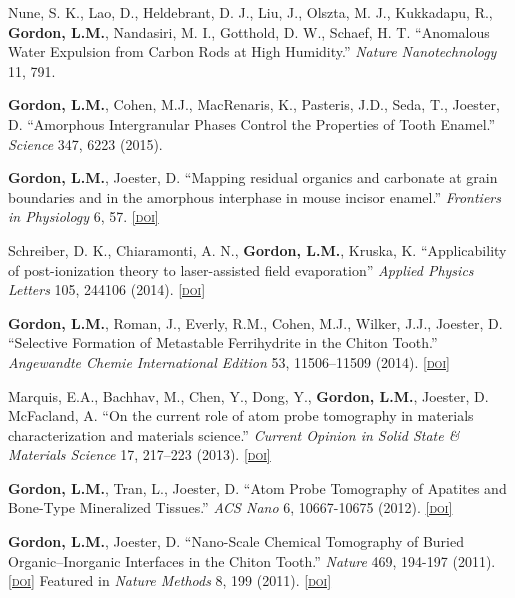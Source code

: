 Nune, S. K., Lao, D., Heldebrant, D. J., Liu, J., Olszta, M. J., Kukkadapu, R., \textbf{Gordon, L.M.}, Nandasiri, M. I., Gotthold, D. W., Schaef, H. T. “Anomalous Water Expulsion from Carbon Rods at High Humidity.” \emph{Nature Nanotechnology} 11, 791.

\textbf{Gordon, L.M.}, Cohen, M.J., MacRenaris, K., Pasteris, J.D., Seda, T., Joester, D. “Amorphous Intergranular Phases Control the Properties of Tooth Enamel.” \emph{Science} 347, 6223 (2015).

\textbf{Gordon, L.M.}, Joester, D. “Mapping residual organics and carbonate at grain boundaries and in the amorphous interphase in mouse incisor enamel.” \emph{Frontiers in Physiology} 6, 57.  \href{http://dx.doi.org/10.3389/fphys.2014.00509}{\textsc{\footnotesize{[doi]}}}

Schreiber, D. K., Chiaramonti, A. N., \textbf{Gordon, L.M.}, Kruska, K. “Applicability of post-ionization theory to laser-assisted field evaporation” \emph{Applied Physics Letters} 105, 244106 (2014). \href{http://dx.doi.org/10.1063/1.4904802}{\textsc{\footnotesize{[doi]}}}

\textbf{Gordon, L.M.}, Roman, J., Everly, R.M., Cohen, M.J., Wilker, J.J., Joester, D. “Selective Formation of Metastable Ferrihydrite in the Chiton Tooth.” \emph{Angewandte Chemie International Edition} 53, 11506–11509 (2014). 
\href{http://dx.doi.org/10.1002/anie.201406131}{\textsc{\footnotesize{[doi]}}}


Marquis, E.A., Bachhav, M., Chen, Y., Dong, Y., \textbf{Gordon, L.M.}, Joester, D. McFacland, A. ``On the current role of atom probe tomography in materials characterization and materials science.'' \emph{Current Opinion in Solid State \& Materials Science} 17, 217–223 (2013). \href{http://dx.doi.org/10.1016/j.cossms.2013.09.003}{\textsc{\footnotesize{[doi]}}}

\textbf{Gordon, L.M.}, Tran, L., Joester, D. “Atom Probe Tomography of Apatites and Bone-Type Mineralized Tissues.” \emph{ACS Nano} 6, 10667-10675 (2012). \href{http://dx.doi.org/10.1021/nn3049957}{\textsc{\footnotesize{[doi]}}}

\textbf{Gordon, L.M.}, Joester, D. “Nano-Scale Chemical Tomography of Buried Organic--Inorganic Interfaces in the Chiton Tooth.” \emph{Nature} 469, 194-197 (2011). \href{http://dx.doi.org/10.1038/nature09686}{\textsc{\footnotesize{[doi]}}} Featured in \emph{Nature Methods} 8, 199 (2011). \href{http://dx.doi.org/10.1038/nmeth0311-199}{\textsc{\footnotesize{[doi]}}}

